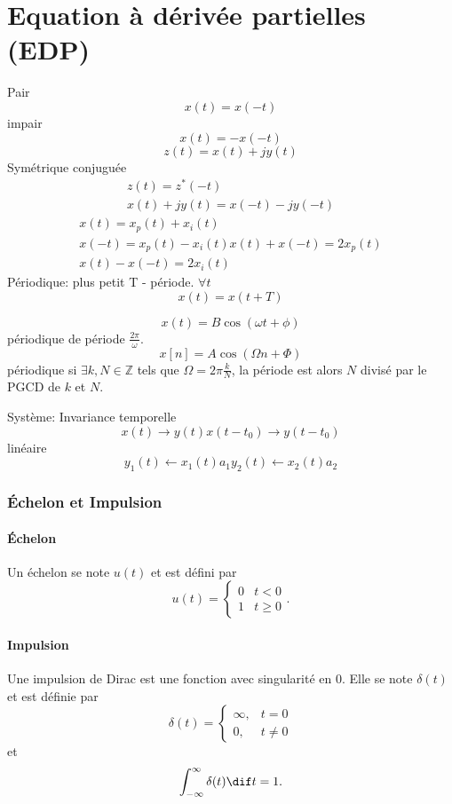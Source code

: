 


\part{Equation à dérivée partielles (EDP)}
Pair
\[ x(t) = x(-t) \]
impair
\[ x(t) = -x(-t) \]
\[ z(t) = x(t) + jy(t) \]
Symétrique conjuguée
\begin{align*}
  z(t) = z^*(-t)\\
  x(t) +jy(t) = x(-t) - jy(-t)
\end{align*}
\begin{align*}
  x(t) = x_p(t) + x_i(t)\\
  x(-t) = x_p(t) - x_i(t)
  x(t) + x(-t) = 2x_p(t)\\
  x(t) - x(-t) = 2x_i(t)
\end{align*}
Périodique: plus petit T - période. 
$\forall t$
\[ x(t) = x(t + T) \]

\[ x(t) = B\cos(\omega t + \phi) \]
périodique de période $\frac{2\pi}{\omega}$.
\[ x[n] = A\cos(\Omega n + \Phi) \]
périodique si $\exists k, N \in \mathbb{Z}$ tels que
$\Omega = 2\pi\frac{k}{N}$, la période est alors $N$ divisé
par le PGCD de $k$ et $N$.

Système:
Invariance temporelle
\[ x(t) \to y(t) x(t-t_0) \to y(t-t_0) \] %
linéaire
\[ y_1(t) \leftarrow x_1(t) a_1
y_2(t) \leftarrow x_2(t) a_2 \] %

\annexe
\section{Échelon et Impulsion}
\subsection{Échelon}
Un échelon se note $u(t)$ et est défini par
\[ u(t) = \begin{cases}
    0 & t < 0\\
    1 & t \geq 0
\end{cases}. \]

\subsection{Impulsion}
\label{app:dirac}
Une impulsion de Dirac est une fonction avec singularité en 0.
Elle se note $\delta(t)$ et est définie par
\begin{equation}
  \label{eq:dirac1}
  \delta(t) =
  \begin{cases}
    \infty, & t = 0\\
    0, & t \neq 0
  \end{cases}
\end{equation}
et
\begin{equation}
  \label{eq:dirac2}
  \int_{-\infty}^{\infty} \delta(t) \dif t = 1.
\end{equation}

